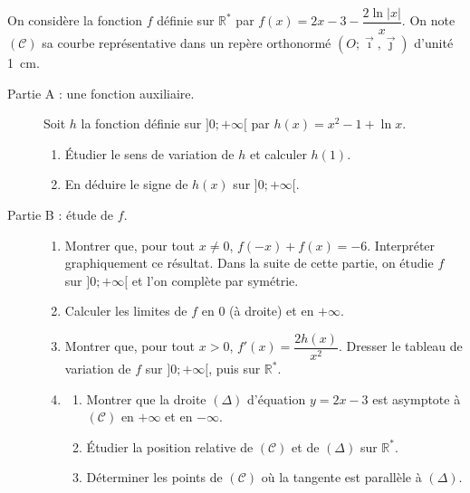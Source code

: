 \begin{exo}
\label{exo:pb ln abs x sur x}
      On consid\`ere la fonction $f$ d\'efinie sur $\mathbb{R}^*$ par
      $f(x) = 2x - 3 - \dfrac{2\ln |x|}{x}$.
      On note $(\mathscr{C})$ sa courbe repr\'esentative dans un rep\`ere orthonorm\'e $(O ; \vec{\imath} , \vec{\jmath})$
      d'unit\'e 1~cm.
      \begin{description}
            \item[Partie A : une fonction auxiliaire.]
                  Soit $h$ la fonction d\'efinie sur $]0 ; +\infty[$ par $h(x) = x^2 - 1 + \ln x$.
                  \begin{enumerate}
                        \item \'Etudier le sens de variation de $h$ et calculer $h(1)$.
                        \item En d\'eduire le signe de $h(x)$ sur $]0 ; +\infty[$.
                  \end{enumerate}
            \item[Partie B : \'etude de $f$.]
                  \begin{enumerate}
                        \item Montrer que, pour tout $x \neq 0$, $f(-x) + f(x) = -6$. Interpr\'eter graphiquement ce r\'esultat.
                              Dans la suite de cette partie, on \'etudie $f$ sur $]0 ; +\infty[$ et l'on compl\`ete par sym\'etrie.
                        \item Calculer les limites de $f$ en $0$ (\`a droite) et en $+\infty$.
                        \item Montrer que, pour tout $x > 0$, $f'(x) = \dfrac{2h(x)}{x^2}$.
                              Dresser le tableau de variation de $f$ sur $]0 ; +\infty[$, puis sur $\mathbb{R}^*$.
                        \item \begin{enumerate}
                                    \item Montrer que la droite $(\Delta)$ d'\'equation $y = 2x - 3$ est asymptote \`a $(\mathscr{C})$
                                          en $+\infty$ et en $-\infty$.
                                    \item \'Etudier la position relative de $(\mathscr{C})$ et de $(\Delta)$ sur $\mathbb{R}^*$.
                                    \item D\'eterminer les points de $(\mathscr{C})$ o\`u la tangente est parall\`ele \`a $(\Delta)$.
                              \end{enumerate}

\end{enumerate}
\end{description}
\end{exo}
